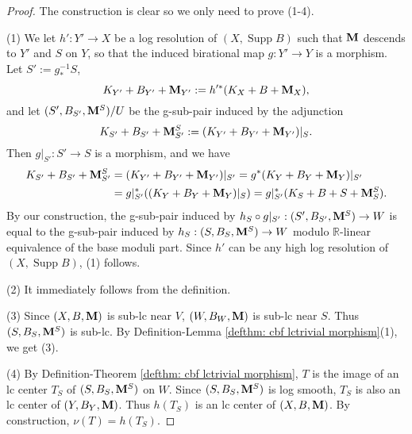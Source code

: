 \documentclass[11pt]{amsart}
\numberwithin{equation}{section}
\newcommand{\Mm}{{\bf{M}}}
\newcommand{\Rr}{\mathbb{R}}
\newcommand{\Supp}{\operatorname{Supp}}
\theoremstyle{definition}
\theoremstyle{definition}
\theoremstyle{definition}
\begin{document}
\begin{proof}
    The construction is clear so we only need to prove (1-4). 

    (1) We let $h': Y'\rightarrow X$ be a log resolution of $(X,\Supp B)$ such that $\Mm$ descends to $Y'$ and $S$ on $Y$, so that the induced birational map $g: Y'\rightarrow Y$ is a morphism. Let $S':=g^{-1}_*S$, 
    $$K_{Y'}+B_{Y'}+\Mm_{Y'}:=h'^*(K_X+B+\Mm_X),$$
    and let $(S',B_{S'},\Mm^S)/U$ be the g-sub-pair induced by the adjunction
    $$K_{S'}+B_{S'}+\Mm^S_{S'}:=(K_{Y'}+B_{Y'}+\Mm_{Y'})|_S.$$
    Then $g|_{S'}: S'\rightarrow S$ is a morphism, and we have
    \begin{align*}
       K_{S'}+B_{S'}+\Mm^S_{S'}&=(K_{Y'}+B_{Y'}+\Mm_{Y'})|_{S'}=g^*(K_Y+B_Y+\Mm_Y)|_{S'}\\
       &=g|_{S'}^*((K_Y+B_Y+\Mm_Y)|_S)=g|_{S'}^*(K_S+B+S+\Mm^S_S).
    \end{align*}
    By our construction, the g-sub-pair induced by $h_S\circ g|_{S'}: (S',B_{S'},\Mm^S)\rightarrow W$ is equal to the g-sub-pair induced by $h_S: (S,B_{S},\Mm^S)\rightarrow W$ modulo $\Rr$-linear equivalence of the base moduli part. Since $h'$ can be any high log resolution of $(X,\Supp B)$, (1) follows.

    (2) It immediately follows from the definition. 

    (3) Since $(X,B,\Mm)$ is sub-lc near $V$, $(W,B_W,\Mm)$ is sub-lc near $S$. Thus $(S,B_S,\Mm^S)$ is sub-lc. By Definition-Lemma \ref{defthm: cbf lctrivial morphism}(1), we get (3).

    (4) By Definition-Theorem \ref{defthm: cbf lctrivial morphism}, $T$ is the image of an lc center $T_S$ of $(S,B_S,\Mm^S)$ on $W$. Since $(S,B_S,\Mm^S)$ is log smooth, $T_S$ is also an lc center of $(Y,B_Y,\Mm)$. Thus $h(T_S)$ is an lc center of $(X,B,\Mm)$. By construction, $\nu(T)=h(T_S)$.
\end{proof}
\end{document}
